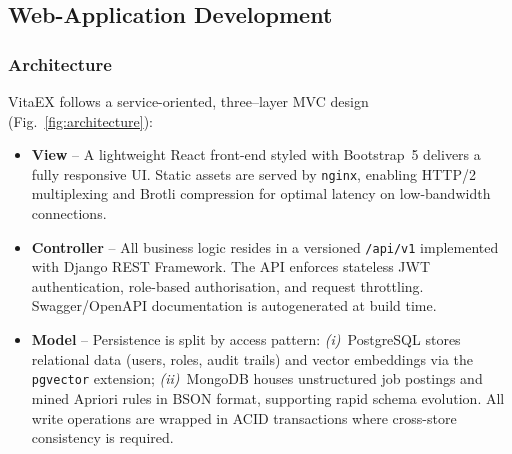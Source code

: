 \documentclass[runningheads]{llncs}
\begin{document}

\subsection{Web-Application Development}
\label{ssec:web_dev}

\subsubsection{Architecture}
VitaEX follows a service-oriented, three–layer MVC design (Fig.~\ref{fig:architecture}):
\begin{itemize}[leftmargin=*]
	\item \textbf{View} – A lightweight React front-end styled with Bootstrap~5 delivers a fully
	responsive UI.  Static assets are served by \texttt{nginx}, enabling HTTP/2
	multiplexing and Brotli compression for optimal latency on low-bandwidth connections.
	\item \textbf{Controller} – All business logic resides in a versioned \texttt{/api/v1}
	implemented with Django REST Framework.  The API enforces stateless JWT
	authentication, role-based authorisation, and request throttling.  Swagger/OpenAPI
	documentation is autogenerated at build time.
	\item \textbf{Model} – Persistence is split by access pattern:  
	\emph{(i)}~PostgreSQL stores relational data (users, roles, audit trails) and vector
	embeddings via the \texttt{pgvector} extension;  
	\emph{(ii)}~MongoDB houses unstructured job postings and mined Apriori rules in BSON
	format, supporting rapid schema evolution.  
	All write operations are wrapped in ACID transactions where cross-store consistency
	is required.
\end{itemize}


%	
%	
\end{document}
